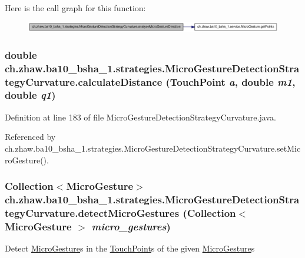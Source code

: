 Here is the call graph for this function:\nopagebreak
\begin{figure}[H]
\begin{center}
\leavevmode
\includegraphics[width=403pt]{classch_1_1zhaw_1_1ba10__bsha__1_1_1strategies_1_1MicroGestureDetectionStrategyCurvature_a7d6da421d9cd91b8eccad94f0755a0f0_cgraph}
\end{center}
\end{figure}
\hypertarget{classch_1_1zhaw_1_1ba10__bsha__1_1_1strategies_1_1MicroGestureDetectionStrategyCurvature_aa729634754fd1d0e1d5c4f0c5b403500}{
\subsubsection[{calculateDistance}]{\setlength{\rightskip}{0pt plus 5cm}double ch.zhaw.ba10\_\-bsha\_\-1.strategies.MicroGestureDetectionStrategyCurvature.calculateDistance ({\bf TouchPoint} {\em a}, \/  double {\em m1}, \/  double {\em q1})}}
\label{classch_1_1zhaw_1_1ba10__bsha__1_1_1strategies_1_1MicroGestureDetectionStrategyCurvature_aa729634754fd1d0e1d5c4f0c5b403500}


Definition at line 183 of file MicroGestureDetectionStrategyCurvature.java.

Referenced by ch.zhaw.ba10\_\-bsha\_\-1.strategies.MicroGestureDetectionStrategyCurvature.setMicroGesture().\hypertarget{classch_1_1zhaw_1_1ba10__bsha__1_1_1strategies_1_1MicroGestureDetectionStrategyCurvature_a939545a8c5597d693f4857a8f6195fc9}{
\subsubsection[{detectMicroGestures}]{\setlength{\rightskip}{0pt plus 5cm}Collection$<${\bf MicroGesture}$>$ ch.zhaw.ba10\_\-bsha\_\-1.strategies.MicroGestureDetectionStrategyCurvature.detectMicroGestures (Collection$<$ {\bf MicroGesture} $>$ {\em micro\_\-gestures})}}
\label{classch_1_1zhaw_1_1ba10__bsha__1_1_1strategies_1_1MicroGestureDetectionStrategyCurvature_a939545a8c5597d693f4857a8f6195fc9}
Detect \hyperlink{}{MicroGesture}s in the \hyperlink{classch_1_1zhaw_1_1ba10__bsha__1_1_1TouchPoint}{TouchPoint}s of the given \hyperlink{}{MicroGesture}s


